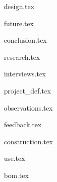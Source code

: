 \documentclass{book}
\begin{document}
{design.tex}

{future.tex}

{conclusion.tex}

\appendix

{research.tex}

{interviews.tex}

{project_def.tex}

{observations.tex}

{feedback.tex}

{construction.tex}

{use.tex}

{bom.tex}

\backmatter

\printbibliography[
title={References},
heading=bibintoc
]
\end{document}
